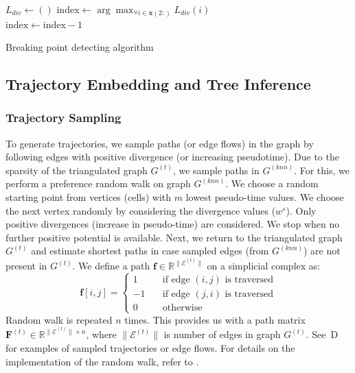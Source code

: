 \begin{algorithm}
    $L_{div} \gets ()$ 
    $\text{index} \gets \arg\max_{\forall i \in \textbf{x}(2:)} L_{div}(i)$\\
    $\text{index} \gets \text{index}-1$ 

    \caption{Breaking point detecting algorithm}
    \label{alg:breaking_point}
\end{algorithm}

\subsection{Trajectory Embedding and Tree Inference}

\subsubsection{Trajectory Sampling}

To generate trajectories, we sample paths (or edge flows) in the graph by following edges with positive divergence (or increasing pseudotime).  Due to the sparsity of the triangulated graph $G^{(t)}$, we sample paths in $G^{(knn)}$. For this, we perform a preference random walk on graph $G^{(knn)}$. We choose a random starting point from vertices (cells) with $m$ lowest pseudo-time values. We choose the next vertex randomly by considering the divergence values ($w^s$). Only positive divergences (increase in pseudo-time) are considered. We stop when no further positive potential is available. Next, we return to the triangulated graph $G^{(t)}$ and estimate shortest paths in case sampled edges (from $G^{(knn)}$) are not present in $G^{(t)}$. We define a path $\mathbf{f}\in\mathbb{R}^{\|\mathcal{E}^{(t)}\|}$ on a simplicial complex as:
\begin{equation}
    \mathbf{f}[i,j] = \begin{cases}
        1\quad & \text{if edge }(i,j) \text{ is traversed}\\
        -1\quad & \text{if edge }(j,i) \text{ is traversed}\\
        0 \quad & \text{otherwise}
    \end{cases}
\label{eq:edgeflow}
\end{equation}
Random walk is repeated $n$ times. This provides us with a path matrix $\mathbf{F}^{(t)}\in \mathbb{R}^{\|\mathcal{E}^{(t)}\| \times n}$, where $\|\mathcal{E}^{(t)}\|$ is number of edges in graph $G^{(t)}$. See~D for examples of sampled trajectories or edge flows. For details on the implementation of the random walk, refer to .

